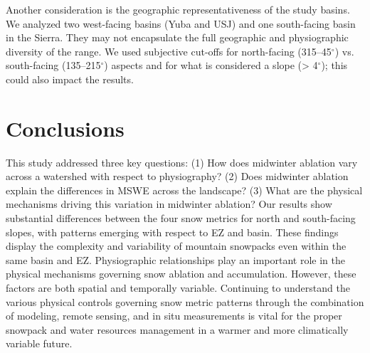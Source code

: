 Another consideration is the geographic representativeness of the study basins. We analyzed two west-facing basins (Yuba and USJ) and one south-facing basin in the Sierra. They may not encapsulate the full geographic and physiographic diversity of the range. We used subjective cut-offs for north-facing (315--45$^{\circ}$) vs. south-facing (135--215$^{\circ}$) aspects and for what is considered a slope (> 4$^{\circ}$); this could also impact the results.

\hypertarget{ch2-conclusions}{\section{Conclusions}\label{ch2-conclusions}}

This study addressed three key questions: (1) How does midwinter ablation vary across a watershed with respect to physiography? (2) Does midwinter ablation explain the differences in MSWE across the landscape? (3) What are the physical mechanisms driving this variation in midwinter ablation? Our results show substantial differences between the four snow metrics for north and south-facing slopes, with patterns emerging with respect to EZ and basin. These findings display the complexity and variability of mountain snowpacks even within the same basin and EZ. Physiographic relationships play an important role in the physical mechanisms governing snow ablation and accumulation. However, these factors are both spatial and temporally variable. Continuing to understand the various physical controls governing snow metric patterns through the combination of modeling, remote sensing, and in situ measurements is vital for the proper snowpack and water resources management in a warmer and more climatically variable future.

\clearpage


